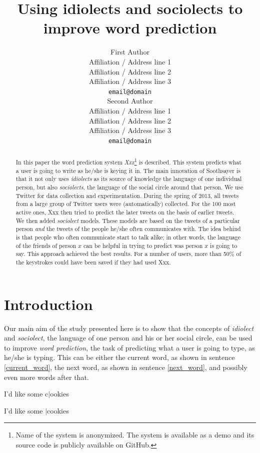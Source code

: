\documentclass[11pt]{article}
\title{Using idiolects and sociolects to improve word prediction}
\author{First Author \\
  Affiliation / Address line 1 \\
  Affiliation / Address line 2 \\
  Affiliation / Address line 3 \\
  {\tt email@domain} \\\And
  Second Author \\
  Affiliation / Address line 1 \\
  Affiliation / Address line 2 \\
  Affiliation / Address line 3 \\
  {\tt email@domain} \\}
\date{}
\begin{document}
\maketitle

\begin{abstract}
In this paper the word prediction system \emph{Xxx}\footnote{Name of the system is anonymized. The system is available as a demo and its source code is publicly available on GitHub.} is described. This system predicts what a user is going to write as he/she is keying it in. The main innovation of Soothsayer is that it not only uses \emph{idiolects} as its source of knowledge the language of one individual person, but also \emph{sociolects}, the language of the social circle around that person. We use Twitter for data collection and experimentation. During the spring of 2013, all tweets from a large group of Twitter users were (automatically) collected. For the 100 most active ones, Xxx then tried to predict the later tweets on the basis of earlier tweets. We then added \emph{sociolect} models. These models are based on the tweets of a particular person \emph{and} the tweets of the people he/she often communicates with. The idea behind is that people who often communicate start to talk alike; in other words, the language of the friends of person $x$ can be helpful in trying to predict was person $x$ is going to say. This approach achieved the best results. For a number of users, more than 50\% of the keystrokes could have been saved if they had used Xxx. 
\end{abstract}

\section{Introduction} \label{intro}

Our main aim of the study presented here is to show that the concepts of \emph{idiolect} and \emph{sociolect}, the language of one person and his or her social circle, can be used to improve \emph{word prediction}, the task of predicting what a user is going to type, as he/she is typing. This can be either the current word, as shown in sentence \ref{current_word}, the next word, as shown in sentence \ref{next_word}, and possibly even more words after that. 
\begin{examples}
\item I'd like some c$|$ookies \label{current_word}
\item I'd like some $|$cookies \label{next_word}
\end{examples}
\end{document}
